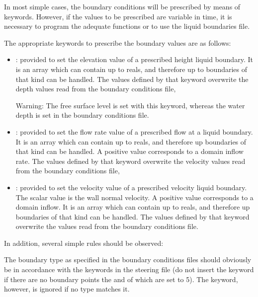 In most simple cases, the boundary conditions will be prescribed by means of
keywords. However, if the values to be prescribed are variable in time, it is
necessary to program the adequate functions or to use the liquid boundaries
file.

The appropriate keywords to prescribe the boundary values are as follows:

\begin{itemize}
\item {}: provided to set the
elevation value of a prescribed height liquid boundary. It is an array which
can contain up to  reals,
and therefore up to  boundaries of that kind
can be handled. The values defined by that keyword overwrite the depth values
read from the boundary conditions file,

\begin{WarningBlock}{Warning:}
The free surface level is set with this keyword, whereas the water depth is set
in the boundary conditions file.
\end{WarningBlock}

\item {}: provided to set the flow rate value of a
prescribed flow at a liquid boundary. It is an array which can contain up to
 reals, and therefore up 
boundaries of that kind can be handled. A
positive value corresponds to a domain inflow rate. The values defined by that
keyword overwrite the velocity values read from the boundary conditions file,

\item {}: provided to set the velocity value of a
prescribed velocity liquid boundary. The scalar value is the wall normal
velocity. A positive value corresponds to a domain inflow. It is an array which
can contain up to  reals,
and therefore up  boundaries of that kind can
be handled. The values defined by that keyword overwrite the values read from
the boundary conditions file.
\end{itemize}

In addition, several simple rules should be observed:

The boundary type as specified in the boundary conditions files should
obviously be in accordance with the keywords in the steering file (do not
insert the keyword  if there are no boundary
points the  and  of which are set to
5). The keyword, however, is ignored if no type matches it.

